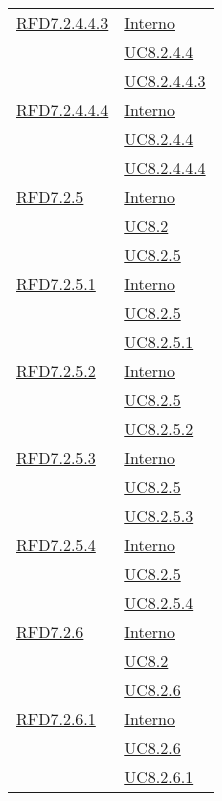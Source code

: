 \begin{longtable}{|>{\centering}m{5cm}|m{5cm}<{\centering}|}
\hyperlink{RFD7.2.4.4.3}{RFD7.2.4.4.3} & \hyperlink{Interno}{Interno}\\
& \hyperref[UC8.2.4.4]{UC8.2.4.4}\\
& \hyperref[UC8.2.4.4.3]{UC8.2.4.4.3}\\ \hline

\hyperlink{RFD7.2.4.4.4}{RFD7.2.4.4.4} & \hyperlink{Interno}{Interno}\\
& \hyperref[UC8.2.4.4]{UC8.2.4.4}\\
& \hyperref[UC8.2.4.4.4]{UC8.2.4.4.4}\\ \hline

\hyperlink{RFD7.2.5}{RFD7.2.5} & \hyperlink{Interno}{Interno}\\
& \hyperref[UC8.2]{UC8.2}\\
& \hyperref[UC8.2.5]{UC8.2.5}\\ \hline

\hyperlink{RFD7.2.5.1}{RFD7.2.5.1} & \hyperlink{Interno}{Interno}\\
& \hyperref[UC8.2.5]{UC8.2.5}\\
& \hyperref[UC8.2.5.1]{UC8.2.5.1}\\ \hline

\hyperlink{RFD7.2.5.2}{RFD7.2.5.2} & \hyperlink{Interno}{Interno}\\
& \hyperref[UC8.2.5]{UC8.2.5}\\
& \hyperref[UC8.2.5.2]{UC8.2.5.2}\\ \hline

\hyperlink{RFD7.2.5.3}{RFD7.2.5.3} & \hyperlink{Interno}{Interno}\\
& \hyperref[UC8.2.5]{UC8.2.5}\\
& \hyperref[UC8.2.5.3]{UC8.2.5.3}\\ \hline

\hyperlink{RFD7.2.5.4}{RFD7.2.5.4} & \hyperlink{Interno}{Interno}\\
& \hyperref[UC8.2.5]{UC8.2.5}\\
& \hyperref[UC8.2.5.4]{UC8.2.5.4}\\ \hline

\hyperlink{RFD7.2.6}{RFD7.2.6} & \hyperlink{Interno}{Interno}\\
& \hyperref[UC8.2]{UC8.2}\\
& \hyperref[UC8.2.6]{UC8.2.6}\\ \hline

\hyperlink{RFD7.2.6.1}{RFD7.2.6.1} & \hyperlink{Interno}{Interno}\\
& \hyperref[UC8.2.6]{UC8.2.6}\\
& \hyperref[UC8.2.6.1]{UC8.2.6.1}\\ \hline


\end{longtable}

